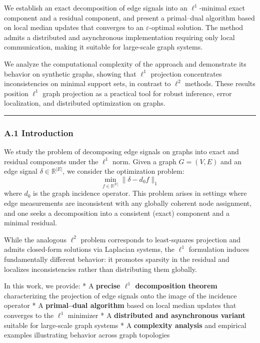 \documentclass[
]{article}
\begin{document}
We establish an exact decomposition of edge signals into an
\(\ell^1\)-minimal exact component and a residual component, and present
a primal--dual algorithm based on local median updates that converges to
an \(\varepsilon\)-optimal solution. The method admits a distributed and
asynchronous implementation requiring only local communication, making
it suitable for large-scale graph systems.

We analyze the computational complexity of the approach and demonstrate
its behavior on synthetic graphs, showing that \(\ell^1\) projection
concentrates inconsistencies on minimal support sets, in contrast to
\(\ell^2\) methods. These results position \(\ell^1\) graph projection
as a practical tool for robust inference, error localization, and
distributed optimization on graphs.

\begin{center}\rule{0.5\linewidth}{0.5pt}\end{center}

\subsubsection{A.1 Introduction}\label{a.1-introduction}

We study the problem of decomposing edge signals on graphs into exact
and residual components under the \(\ell^1\) norm. Given a graph
\(G = (V, E)\) and an edge signal \(\delta \in \mathbb{R}^{|E|}\), we
consider the optimization problem:
\[ \min_{f \in \mathbb{R}^{|V|}} \|\delta - d_0 f\|_1 \] where \(d_0\)
is the graph incidence operator. This problem arises in settings where
edge measurements are inconsistent with any globally coherent node
assignment, and one seeks a decomposition into a consistent (exact)
component and a minimal residual.

While the analogous \(\ell^2\) problem corresponds to least-squares
projection and admits closed-form solutions via Laplacian systems, the
\(\ell^1\) formulation induces fundamentally different behavior: it
promotes sparsity in the residual and localizes inconsistencies rather
than distributing them globally.

In this work, we provide: * A \textbf{precise \(\ell^1\) decomposition
theorem} characterizing the projection of edge signals onto the image of
the incidence operator * A \textbf{primal--dual algorithm} based on
local median updates that converges to the \(\ell^1\) minimizer * A
\textbf{distributed and asynchronous variant} suitable for large-scale
graph systems * A \textbf{complexity analysis} and empirical examples
illustrating behavior across graph topologies
\end{document}
